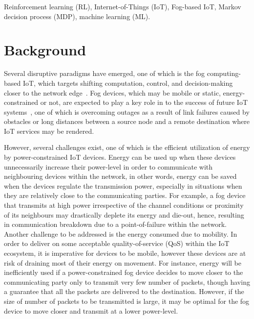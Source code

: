 \documentclass[journal]{IEEEtran}
\begin{document}
\begin{IEEEkeywords}
Reinforcement learning (RL), Internet-of-Things (IoT), Fog-based IoT, Markov decision process (MDP), machine learning (ML).
\end{IEEEkeywords}






%
\IEEEpeerreviewmaketitle

\section{Background}
Several disruptive paradigms have emerged, one of which is the fog computing-based IoT, which targets shifting computation, control, and decision-making closer to the network edge~\cite{Omoniwa2018}. Fog devices, which may be mobile or static, energy-constrained or not, are expected to play a key role in to the success of future IoT systems~\cite{Chiangh2016}, one of which is overcoming outages as a result of link failures caused by obstacles or long distances between a source node and a remote destination where IoT services may be rendered.

However, several challenges exist, one of which is the efficient utilization of energy by power-constrained IoT devices. Energy can be used up when these devices unnecessarily increase their power-level in order to communicate with neighbouring devices within the network, in other words, energy can be saved when the devices regulate the transmission power, especially in situations when they are relatively close to the communicating parties. For example, a fog device that transmits at high power irrespective of the channel conditions or proximity of its neighbours may drastically deplete its energy and die-out, hence, resulting in communication breakdown due to a point-of-failure within the network. Another challenge to be addressed is the energy consumed due to mobility. In order to deliver on some acceptable quality-of-service (QoS) within the IoT ecosystem, it is imperative for devices to be mobile, however these devices are at risk of draining most of their energy on movement. For instance, energy will be inefficiently used if a power-constrained fog device decides to move closer to the communicating party only to transmit very few number of packets, though having a guarantee that all the packets are delivered to the destination. However, if the size of number of packets to be transmitted is large, it may be optimal for the fog device to move closer and transmit at a lower power-level.
\end{document}

